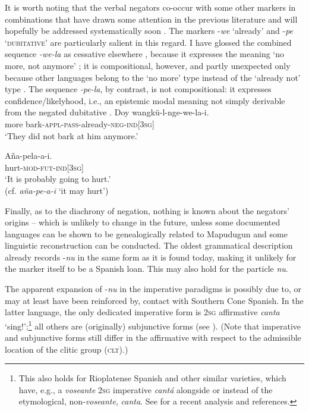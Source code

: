 \documentclass[output=paper,colorlinks,citecolor=brown,draft]{langscibook}
\begin{document}
 It is worth noting that the verbal negators co-occur with some other markers in combinations that have drawn some attention in the previous literature and will hopefully be addressed systematically soon \citep{ChandiaEtAl-inprep}. The markers -\textit{we} ‘already’ and -\textit{pe} ‘\textsc{dubitative}’ are particularly salient in this regard. I have glossed the combined sequence \textit{{}-we-la} as cessative elsewhere \citep{Zúñiga2006}, because it expresses the meaning ‘no more, not anymore’ ; it is compositional, however, and partly unexpected only because other languages belong to the ‘no more’ type instead of the ‘already not’ type \citep{Auwera1998}. The sequence \textit{-pe-la}, by contrast, is not compositional: it expresses confidence/likelyhood, i.e., an epistemic modal meaning not simply derivable from the negated dubitative .
% 
\ea\label{ex:mapu:30}
    \ea\label{ex:mapu:30a}
        \gll Doy    wangkü-l-nge-we-la-i. \\ 
             more    bark-\textsc{appl-pass-}already-\textsc{neg-ind[3sg]} \\
        \glt ‘They did not bark at him anymore.’ \citep[262]{Salas2006}
    
    \ex\label{ex:mapu:30b}
        \gll Aña-pela-a-i. \\
             hurt-\textsc{mod-fut-ind[3sg]} \\
        \glt ‘It is probably going to hurt.’ \citep[250]{Smeets2008}\\
     (cf. \textit{aña-pe-a-i} ‘it may hurt’)
    \z
\z 
 
Finally, as to the diachrony of negation, nothing is known about the negators’ origins – which is unlikely to change in the future, unless some documented languages can be shown to be genealogically related to Mapudugun and some linguistic reconstruction can be conducted. The oldest grammatical description \citep{Valdivia1606} already records \nobreakdash-\textit{nu} in the same form as it is found today, making it unlikely for the marker itself to be a Spanish loan. This may also hold for the particle \textit{nu}.

The apparent expansion of -\textit{nu} in the imperative paradigms is possibly due to, or may at least have been reinforced by, contact with Southern Cone Spanish. In the latter language, the only dedicated imperative form is \textsc{2sg} affirmative \textit{canta} ‘sing!’;\footnote{This also holds for Rioplatense Spanish and other similar varieties, which have, e.g., a \textit{voseante} \textsc{2sg} imperative \textit{cantá} alongside or instead of the etymological, non-\textit{voseante}, \textit{canta}. See \citet{BaqueroWestphal2014} for a recent analysis and references.} all others are (originally) subjunctive forms (see ). (Note that imperative and subjunctive forms still differ in the affirmative with respect to the admissible location of the clitic group (\textsc{clt}).)
\end{document}
